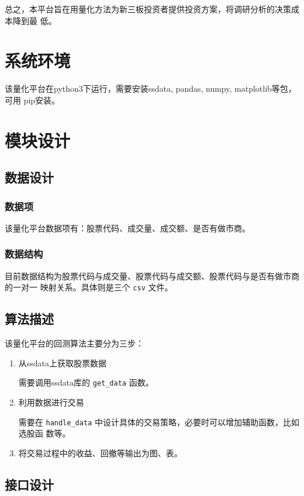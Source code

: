 \documentclass[11pt]{ctexart}
\begin{document}
总之，本平台旨在用量化方法为新三板投资者提供投资方案，将调研分析的决策成本降到最
低。

\section{系统环境}
\label{sec:org8e37e5d}
该量化平台在python3下运行，需要安装ssdata, pandas, numpy, matplotlib等包，可用
pip安装。
\section{模块设计}
\label{sec:org7062a3d}
\subsection{数据设计}
\label{sec:org465d866}
\subsubsection{数据项}
\label{sec:orge8d01d8}
该量化平台数据项有：股票代码、成交量、成交额、是否有做市商。
\subsubsection{数据结构}
\label{sec:orgfda7246}
目前数据结构为股票代码与成交量、股票代码与成交额、股票代码与是否有做市商的一对一
映射关系。具体则是三个 \texttt{csv} 文件。
\subsection{算法描述}
\label{sec:org9262928}

该量化平台的回测算法主要分为三步：

\begin{enumerate}
\item 从ssdata上获取股票数据

需要调用ssdata库的 \texttt{get\_data} 函数。

\item 利用数据进行交易

需要在 \texttt{handle\_data} 中设计具体的交易策略，必要时可以增加辅助函数，比如选股函
数等。

\item 将交易过程中的收益、回撤等输出为图、表。
\end{enumerate}

\subsection{接口设计}
\label{sec:org399148e}
\end{document}
